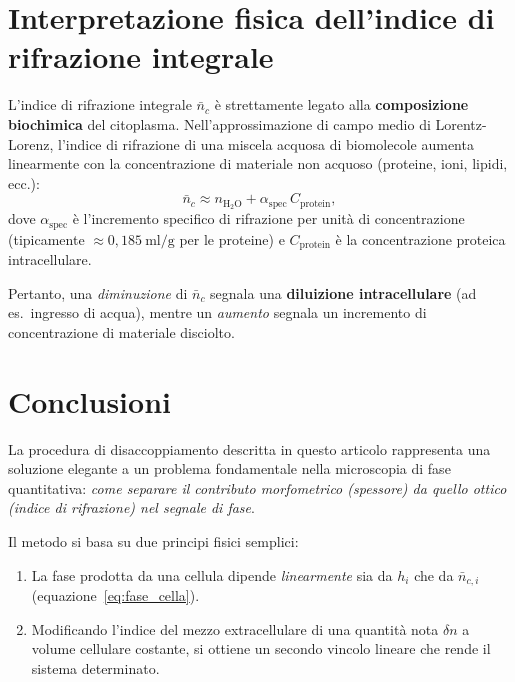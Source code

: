 \section{Interpretazione fisica dell'indice di rifrazione integrale}

L'indice di rifrazione integrale $\bar{n}_c$ è strettamente legato alla
\textbf{composizione biochimica} del citoplasma. Nell'approssimazione di
campo medio di Lorentz-Lorenz, l'indice di rifrazione di una miscela acquosa di
biomolecole aumenta linearmente con la concentrazione di materiale non acquoso
(proteine, ioni, lipidi, ecc.):
\[
  \bar{n}_c \approx n_{\mathrm{H_2O}} + \alpha_\mathrm{spec}\,C_\mathrm{protein},
\]
dove $\alpha_\mathrm{spec}$ è l'incremento specifico di rifrazione per unità di
concentrazione (tipicamente $\approx 0{,}185\ \mathrm{ml/g}$ per le proteine) e
$C_\mathrm{protein}$ è la concentrazione proteica intracellulare.

Pertanto, una \emph{diminuzione} di $\bar{n}_c$ segnala una \textbf{diluizione
intracellulare} (ad es.\ ingresso di acqua), mentre un \emph{aumento} segnala
un incremento di concentrazione di materiale disciolto.

\section{Conclusioni}

La procedura di disaccoppiamento descritta in questo articolo rappresenta una
soluzione elegante a un problema fondamentale nella microscopia di fase
quantitativa: \emph{come separare il contributo morfometrico (spessore) da quello
ottico (indice di rifrazione) nel segnale di fase}.

Il metodo si basa su due principi fisici semplici:
\begin{enumerate}
  \item La fase prodotta da una cellula dipende \emph{linearmente} sia da $h_i$
        che da $\bar{n}_{c,i}$ (equazione~\eqref{eq:fase_cella}).
  \item Modificando l'indice del mezzo extracellulare di una quantità nota
        $\delta n$ a volume cellulare costante, si ottiene un secondo vincolo
        lineare che rende il sistema determinato.
\end{enumerate}


